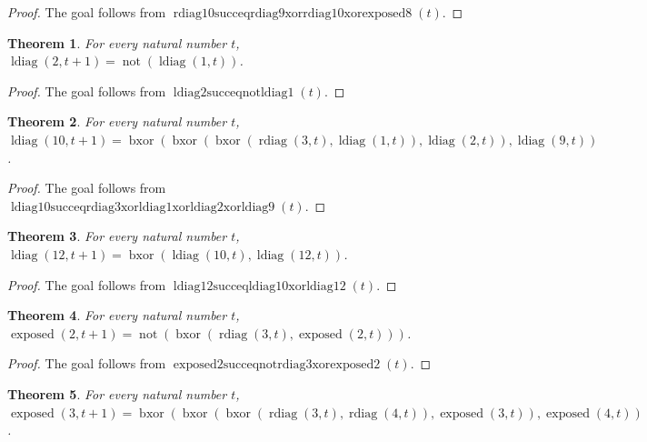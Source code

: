 \documentclass[11pt]{article}
\newtheorem{theorem}{Theorem}[section]
\theoremstyle{definition}
\begin{document}
\begin{proof}
The goal follows from \(\operatorname{rdiag10succeqrdiag9xorrdiag10xorexposed8}(t)\).
\end{proof}
\begin{theorem}
\label{ll:observations:ldiag2-succ-eq-not-ldiag1}
For every natural number \(t\), \(\operatorname{ldiag}(2, t + 1) = \operatorname{not}(\operatorname{ldiag}(1, t))\).
\end{theorem}
\begin{proof}
The goal follows from \(\operatorname{ldiag2succeqnotldiag1}(t)\).
\end{proof}
\begin{theorem}
\label{ll:observations:ldiag10-succ-eq-rdiag3-xor-ldiag1-xor-ldiag2-xor-ldiag9}
For every natural number \(t\), \(\operatorname{ldiag}(10, t + 1) = \operatorname{bxor}(\operatorname{bxor}(\operatorname{bxor}(\operatorname{rdiag}(3, t), \operatorname{ldiag}(1, t)), \operatorname{ldiag}(2, t)), \operatorname{ldiag}(9, t))\).
\end{theorem}
\begin{proof}
The goal follows from \(\operatorname{ldiag10succeqrdiag3xorldiag1xorldiag2xorldiag9}(t)\).
\end{proof}
\begin{theorem}
\label{ll:observations:ldiag12-succ-eq-ldiag10-xor-ldiag12}
For every natural number \(t\), \(\operatorname{ldiag}(12, t + 1) = \operatorname{bxor}(\operatorname{ldiag}(10, t), \operatorname{ldiag}(12, t))\).
\end{theorem}
\begin{proof}
The goal follows from \(\operatorname{ldiag12succeqldiag10xorldiag12}(t)\).
\end{proof}
\begin{theorem}
\label{ll:observations:exposed2-succ-eq-not-rdiag3-xor-exposed2}
For every natural number \(t\), \(\operatorname{exposed}(2, t + 1) = \operatorname{not}(\operatorname{bxor}(\operatorname{rdiag}(3, t), \operatorname{exposed}(2, t)))\).
\end{theorem}
\begin{proof}
The goal follows from \(\operatorname{exposed2succeqnotrdiag3xorexposed2}(t)\).
\end{proof}
\begin{theorem}
\label{ll:observations:exposed3-succ-eq-rdiag3-xor-rdiag4-xor-exposed3-xor-exposed4}
For every natural number \(t\), \(\operatorname{exposed}(3, t + 1) = \operatorname{bxor}(\operatorname{bxor}(\operatorname{bxor}(\operatorname{rdiag}(3, t), \operatorname{rdiag}(4, t)), \operatorname{exposed}(3, t)), \operatorname{exposed}(4, t))\).
\end{theorem}
\end{document}
